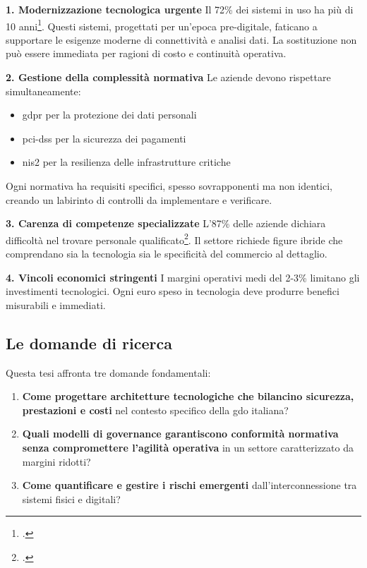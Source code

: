 \textbf{1. Modernizzazione tecnologica urgente}
Il 72\% dei sistemi in uso ha più di 10 anni\footcite{federdistribuzione2023}. Questi sistemi, progettati per un'epoca pre-digitale, faticano a supportare le esigenze moderne di connettività e analisi dati. La sostituzione non può essere immediata per ragioni di costo e continuità operativa.

\textbf{2. Gestione della complessità normativa}
Le aziende devono rispettare simultaneamente:
\begin{itemize}
\item \gls{gdpr} per la protezione dei dati personali
\item \gls{pci-dss} per la sicurezza dei pagamenti
\item \gls{nis2} per la resilienza delle infrastrutture critiche
\end{itemize}

Ogni normativa ha requisiti specifici, spesso sovrapponenti ma non identici, creando un labirinto di controlli da implementare e verificare.

\textbf{3. Carenza di competenze specializzate}
L'87\% delle aziende dichiara difficoltà nel trovare personale qualificato\footcite{osservatorio2024}. Il settore richiede figure ibride che comprendano sia la tecnologia sia le specificità del commercio al dettaglio.

\textbf{4. Vincoli economici stringenti}
I margini operativi medi del 2-3\% limitano gli investimenti tecnologici. Ogni euro speso in tecnologia deve produrre benefici misurabili e immediati.

\subsection{Le domande di ricerca}
\label{subsec:domande_ricerca}

Questa tesi affronta tre domande fondamentali:

\begin{enumerate}
\item \textbf{Come progettare architetture tecnologiche che bilancino sicurezza, prestazioni e costi} nel contesto specifico della \gls{gdo} italiana?

\item \textbf{Quali modelli di governance garantiscono conformità normativa senza compromettere l'agilità operativa} in un settore caratterizzato da margini ridotti?

\item \textbf{Come quantificare e gestire i rischi emergenti} dall'interconnessione tra sistemi fisici e digitali?
\end{enumerate}

